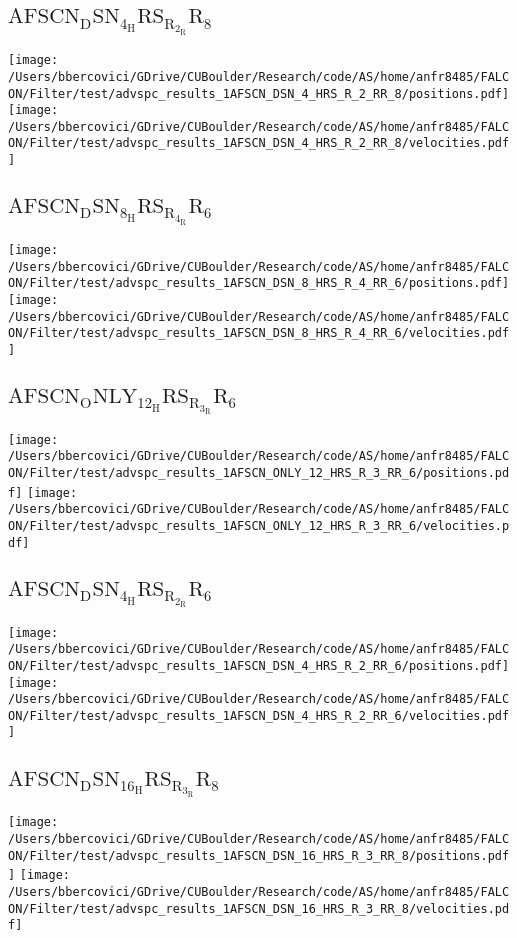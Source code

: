 \subsection{$\mathrm{AFSCN_DSN_4_HRS_R_2_RR_8}$}
\texttt{[image: /Users/bbercovici/GDrive/CUBoulder/Research/code/AS/home/anfr8485/FALCON/Filter/test/advspc\_results\_1AFSCN\_DSN\_4\_HRS\_R\_2\_RR\_8/positions.pdf]}
\texttt{[image: /Users/bbercovici/GDrive/CUBoulder/Research/code/AS/home/anfr8485/FALCON/Filter/test/advspc\_results\_1AFSCN\_DSN\_4\_HRS\_R\_2\_RR\_8/velocities.pdf]}
\subsection{$\mathrm{AFSCN_DSN_8_HRS_R_4_RR_6}$}
\texttt{[image: /Users/bbercovici/GDrive/CUBoulder/Research/code/AS/home/anfr8485/FALCON/Filter/test/advspc\_results\_1AFSCN\_DSN\_8\_HRS\_R\_4\_RR\_6/positions.pdf]}
\texttt{[image: /Users/bbercovici/GDrive/CUBoulder/Research/code/AS/home/anfr8485/FALCON/Filter/test/advspc\_results\_1AFSCN\_DSN\_8\_HRS\_R\_4\_RR\_6/velocities.pdf]}
\subsection{$\mathrm{AFSCN_ONLY_12_HRS_R_3_RR_6}$}
\texttt{[image: /Users/bbercovici/GDrive/CUBoulder/Research/code/AS/home/anfr8485/FALCON/Filter/test/advspc\_results\_1AFSCN\_ONLY\_12\_HRS\_R\_3\_RR\_6/positions.pdf]}
\texttt{[image: /Users/bbercovici/GDrive/CUBoulder/Research/code/AS/home/anfr8485/FALCON/Filter/test/advspc\_results\_1AFSCN\_ONLY\_12\_HRS\_R\_3\_RR\_6/velocities.pdf]}
\subsection{$\mathrm{AFSCN_DSN_4_HRS_R_2_RR_6}$}
\texttt{[image: /Users/bbercovici/GDrive/CUBoulder/Research/code/AS/home/anfr8485/FALCON/Filter/test/advspc\_results\_1AFSCN\_DSN\_4\_HRS\_R\_2\_RR\_6/positions.pdf]}
\texttt{[image: /Users/bbercovici/GDrive/CUBoulder/Research/code/AS/home/anfr8485/FALCON/Filter/test/advspc\_results\_1AFSCN\_DSN\_4\_HRS\_R\_2\_RR\_6/velocities.pdf]}
\subsection{$\mathrm{AFSCN_DSN_16_HRS_R_3_RR_8}$}
\texttt{[image: /Users/bbercovici/GDrive/CUBoulder/Research/code/AS/home/anfr8485/FALCON/Filter/test/advspc\_results\_1AFSCN\_DSN\_16\_HRS\_R\_3\_RR\_8/positions.pdf]}
\texttt{[image: /Users/bbercovici/GDrive/CUBoulder/Research/code/AS/home/anfr8485/FALCON/Filter/test/advspc\_results\_1AFSCN\_DSN\_16\_HRS\_R\_3\_RR\_8/velocities.pdf]}
